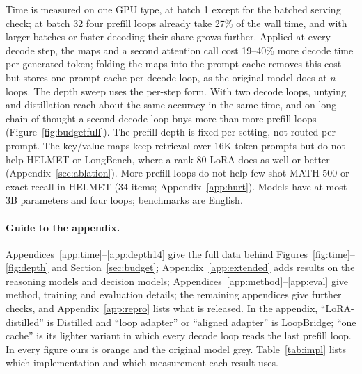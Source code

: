 \documentclass[11pt]{article}
\begin{document}
Time is measured on one GPU type, at batch 1 except for the batched serving check; at batch 32 four prefill loops
already take 27\% of the wall time, and with larger batches or faster decoding their share grows further. Applied at
every decode step, the maps and a second attention call cost 19--40\% more decode time per generated token; folding the
maps into the prompt cache removes this cost but stores one prompt cache per decode loop, as the original model does at
$n$ loops. The depth sweep uses the per-step form. With two decode
loops, untying and distillation reach about the same accuracy in the same time, and on long chain-of-thought a second
decode loop buys more than more prefill loops (Figure~\ref{fig:budgetfull}). The prefill depth is fixed per setting,
not routed per prompt. The key/value maps keep retrieval over 16K-token prompts but do not help HELMET or LongBench,
where a rank-80 LoRA does as well or better (Appendix~\ref{sec:ablation}). More prefill loops do not help few-shot MATH-500 or exact recall in HELMET (34 items;
Appendix~\ref{app:hurt}). Models have at most 3B parameters and four loops; benchmarks are English.


\FloatBarrier


\appendix

\paragraph{Guide to the appendix.} Appendices~\ref{app:time}--\ref{app:depth14} give the full data behind
Figures~\ref{fig:time}--\ref{fig:depth} and Section~\ref{sec:budget}; Appendix~\ref{app:extended} adds results on the
reasoning models and decision models; Appendices~\ref{app:method}--\ref{app:eval} give method, training and evaluation
details; the remaining appendices give further checks, and Appendix~\ref{app:repro} lists what is released. In the
appendix, ``LoRA-distilled'' is Distilled and ``loop adapter'' or ``aligned adapter'' is LoopBridge; ``one cache'' is
its lighter variant in which every decode loop reads the last prefill loop. In every figure ours is orange and the
original model grey. Table~\ref{tab:impl} lists which implementation and which measurement each result uses.
\end{document}
